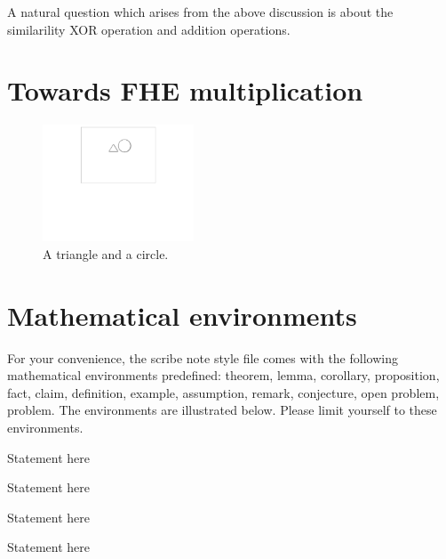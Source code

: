 \documentclass[usletter]{article}
\begin{document}
\begin{remark}
A natural question which arises from the above discussion is about the similarility XOR operation 
and addition operations.   
\end{remark}

\section{Towards FHE multiplication}


\begin{figure}
\begin{center}
\includegraphics[width=0.4\textwidth]{triangle-circle}
\end{center}
\caption{A triangle and a circle.}
\label{fig:triangle-circle}
\end{figure}



\section{Mathematical environments}

For your convenience, the scribe note style file comes
with the following mathematical environments
predefined: theorem, lemma, corollary, proposition,
fact, claim, definition, example, assumption, remark,
conjecture, open problem, problem. The environments are
illustrated below.  Please limit yourself to these
environments.

\begin{theorem}
Statement here 
\end{theorem}

\begin{lemma}
Statement here
\end{lemma}

\begin{corollary}
Statement here
\end{corollary}

\begin{proposition}
Statement here
\end{proposition}
\end{document}
